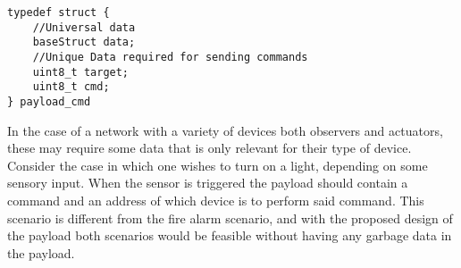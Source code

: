 \bigskip \noindent
\begin{lstlisting}[style=customc,caption={A possible way a struct for designating commands could look in the payload},label={cmdStruct}]
typedef struct { 
    //Universal data
    baseStruct data;
    //Unique Data required for sending commands
    uint8_t target;
    uint8_t cmd;
} payload_cmd
\end{lstlisting}
\bigskip \noindent

In the case of a network with a variety of devices both observers and actuators, these may require some data that is only relevant for their type of device.
Consider the case in which one wishes to turn on a light, depending on some sensory input.
When the sensor is triggered the payload should contain a command and an address of which device is to perform said command.
This scenario is different from the fire alarm scenario, and with the proposed design of the payload both scenarios would be feasible without having any garbage data in the payload.
